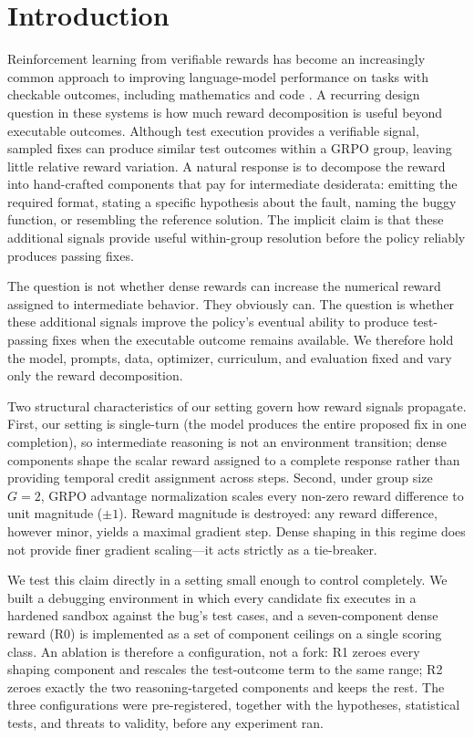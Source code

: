 \documentclass{article}
\begin{document}
\section{Introduction}
Reinforcement learning from verifiable rewards has become an increasingly common approach to improving language-model performance on tasks with checkable outcomes, including mathematics and code \cite{Shao2024, Guo2025}. A recurring design question in these systems is how much reward decomposition is useful beyond executable outcomes. Although test execution provides a verifiable signal, sampled fixes can produce similar test outcomes within a GRPO group, leaving little relative reward variation. A natural response is to decompose the reward into hand-crafted components that pay for intermediate desiderata: emitting the required format, stating a specific hypothesis about the fault, naming the buggy function, or resembling the reference solution. The implicit claim is that these additional signals provide useful within-group resolution before the policy reliably produces passing fixes.

The question is not whether dense rewards can increase the numerical reward assigned to intermediate behavior. They obviously can. The question is whether these additional signals improve the policy's eventual ability to produce test-passing fixes when the executable outcome remains available. We therefore hold the model, prompts, data, optimizer, curriculum, and evaluation fixed and vary only the reward decomposition. 

Two structural characteristics of our setting govern how reward signals propagate. First, our setting is single-turn (the model produces the entire proposed fix in one completion), so intermediate reasoning is not an environment transition; dense components shape the scalar reward assigned to a complete response rather than providing temporal credit assignment across steps. Second, under group size $G=2$, GRPO advantage normalization scales every non-zero reward difference to unit magnitude ($\pm 1$). Reward magnitude is destroyed: any reward difference, however minor, yields a maximal gradient step. Dense shaping in this regime does not provide finer gradient scaling—it acts strictly as a tie-breaker.

We test this claim directly in a setting small enough to control completely. We built a debugging environment in which every candidate fix executes in a hardened sandbox against the bug's test cases, and a seven-component dense reward (R0) is implemented as a set of component ceilings on a single scoring class. An ablation is therefore a configuration, not a fork: R1 zeroes every shaping component and rescales the test-outcome term to the same range; R2 zeroes exactly the two reasoning-targeted components and keeps the rest. The three configurations were pre-registered, together with the hypotheses, statistical tests, and threats to validity, before any experiment ran.
\end{document}
